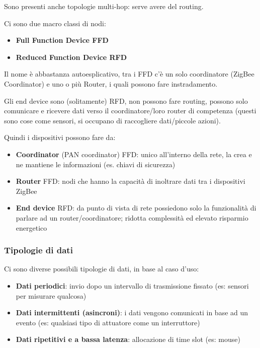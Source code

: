 Sono presenti anche topologie multi-hop: serve avere del routing.

Ci sono due macro classi di nodi: 
\begin{itemize}
	\item \textbf{Full Function Device FFD}
	
    \item \textbf{Reduced Function Device RFD}
\end{itemize}

Il nome è abbastanza autoesplicativo, tra i FFD c'è un solo coordinatore (ZigBee Coordinator) e uno o più Router, i quali possono fare instradamento. 

Gli end device sono (solitamente) RFD, non possono fare routing, possono solo comunicare e ricevere dati verso il coordinatore/loro router di competenza (questi sono cose come sensori, si occupano di raccogliere dati/piccole azioni).

Quindi i dispositivi possono fare da:
\begin{itemize}
	\item \textbf{Coordinator} (PAN coordinator) FFD: unico all'interno della rete, la crea e ne mantiene le informazioni (es. chiavi di sicurezza)
	
    \item \textbf{Router} FFD: nodi che hanno la capacità di inoltrare dati tra i dispositivi ZigBee
	
    \item \textbf{End device} RFD: da punto di vista di rete possiedono solo la funzionalità di parlare ad un router/coordinatore; ridotta complessità ed elevato risparmio energetico
\end{itemize}

\subsubsection{Tipologie di dati} 

Ci sono diverse possibili tipologie di dati, in base al caso d'uso: 
\begin{itemize}
	\item \textbf{Dati periodici}: invio dopo un intervallo di trasmissione fissato (es: sensori per misurare qualcosa)

	\item \textbf{Dati intermittenti (asincroni)}: i dati vengono comunicati in base ad un evento (es: qualsiasi tipo di attuatore come un interruttore)

	\item \textbf{Dati ripetitivi e a bassa latenza}: allocazione di time slot (es: mouse)
\end{itemize}

